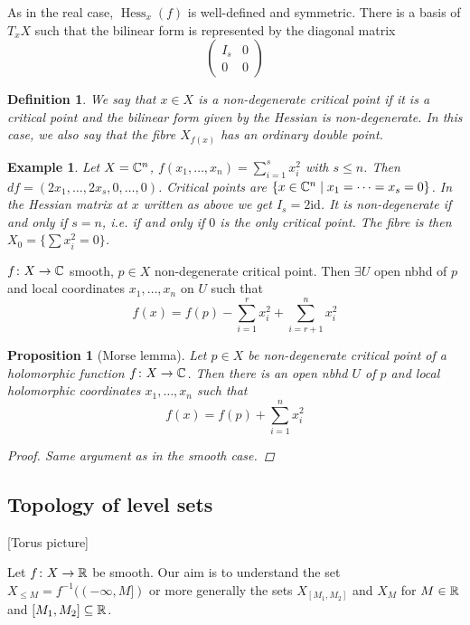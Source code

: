\documentclass[A4paper, british, reqno]{amsart}
\theoremstyle{darkgreentheorem}
\newtheorem{prop}[thm]{Proposition}
\theoremstyle{darkbluedefinition}
\newtheorem{defn}[thm]{Definition}
\theoremstyle{darkredexample}
\newtheorem{exa}[thm]{Example}
\theoremstyle{remark}
\DeclareMathOperator{\Hess}{Hess}
\newcommand{\1}{\mathbbm{1}}
\newcommand{\id}{\mathrm{id}}
\newcommand{\sub}{\subseteq}
\begin{document}
As in the real case, $\Hess_{x}(f)$ is well-defined and symmetric.
There is a basis of $T_{x}X$ such that the bilinear form is represented by the diagonal matrix
\[ \begin{pmatrix} I_{s} & 0 \\ 0 & 0\end{pmatrix} \]

\begin{defn}
    We say that $x\in X$ is a \textit{non-degenerate critical point} if it is a critical point and the bilinear form given by the Hessian is non-degenerate.
    In this case, we also say that the fibre $X_{f(x)}$ has an \textit{ordinary double point}.
\end{defn}

\begin{exa}
    Let $X=\mathbb{C}^{n}$, $f(x_{1},\ldots,x_{n})=\sum_{i=1}^{s}x_{i}^{2}$ with $s\leqslant n$.
    Then $df=(2x_{1},\ldots,2x_{s},0,\ldots,0)$.
    Critical points are $\{x\in \mathbb{C}^{n}\mid x_{1}=\cdots =x_{s}=0\}$.
    In the Hessian matrix at $x$ written as above we get $I_{s}=2\id$.
    It is non-degenerate if and only if $s=n$, i.e. if and only if $0$ is the only critical point.
    The fibre is then $X_{0}=\{\sum x_{i}^{2}=0\}$.
\end{exa}

$f\colon X\to \mathbb{C}$ smooth, $p\in X$ non-degenerate critical point.
Then $\exists U$ open nbhd of $p$ and local coordinates $x_{1},\ldots,x_{n}$ on $U$ such that
\[ f(x)=f(p)-\sum_{i=1}^{r}x_{i}^{2}+\sum_{i=r+1}^{n}x_{i}^{2} \]

\begin{prop}[Morse lemma]
    Let $p\in X$ be non-degenerate critical point of a holomorphic function $f\colon X\to \mathbb{C}$.
    Then there is an open nbhd $U$ of $p$ and local holomorphic coordinates $x_{1},\ldots,x_{n}$ such that
    \[ f(x)=f(p)+\sum_{i=1}^{n}x_{i}^{2} \]
    \begin{proof}
	Same argument as in the smooth case.
    \end{proof}
\end{prop}

\subsection{Topology of level sets}

[Torus picture]

Let $f\colon X\to \mathbb{R}$ be smooth.
Our aim is to understand the set $X_{\leqslant M}=f^{-1}((-\infty,M])$ or more generally the sets $X_{[M_{1},M_{2}]}$ and $X_{M}$ for $M\in \mathbb{R}$ and $[M_{1},M_{2}]\sub \R$.
\end{document}
